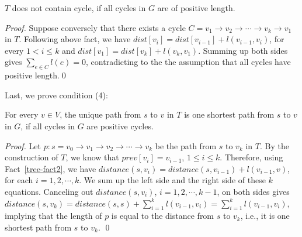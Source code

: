 \begin{fact}
$T$ does not contain cycle, if all cycles in $G$ are of positive length.
\end{fact}
\emph{Proof.} Suppose conversely that there exists a cycle $C = v_1\to v_2\to \cdots \to v_k\to v_1$ in $T$.
Following above fact, we have $dist[v_i] = dist[v_{i-1}] + l(v_{i-1},v_i)$, for every $1 < i \le k$
and $dist[v_1] = dist[v_k] + l(v_k,v_1)$.
Summing up both sides gives $\sum_{e\in C} l(e) = 0$, contradicting to the the assumption
that all cycles have positive length.\qed

Last, we prove condition (4):
\begin{claim}
For every $v\in V$, the unique path from $s$ to $v$ in $T$ is one shortest path from $s$ to $v$ in $G$,
if all cycles in $G$ are positive cycles.
\end{claim}
\emph{Proof.} 
Let $p: s = v_0 \to v_1 \to v_2 \to \cdots \to v_k$ be the path from $s$ to $v_k$ in $T$.
By the construction of $T$, we know that $prev[v_i] = v_{i - 1}$, $1\le i \le k$.
Therefore, using Fact~\ref{tree-fact2}, we have $distance(s, v_i) = distance(s, v_{i-1}) + l(v_{i-1}, v)$,
for each $i = 1, 2, \cdots, k$. We sum up the left side and the right side of these $k$ equations.
Canceling out $distance(s, v_i)$, $i = 1, 2, \cdots, k-1$, on both sides gives
$distance(s,v_k) = distance(s, s) + \sum_{i=1}^k l(v_{i-1}, v_i) = \sum_{i=1}^k l(v_{i-1}, v_i)$, implying that
the length of $p$ is equal to the distance from $s$ to $v_k$, i.e., it is one shortest path from $s$ to $v_k$. \qed


